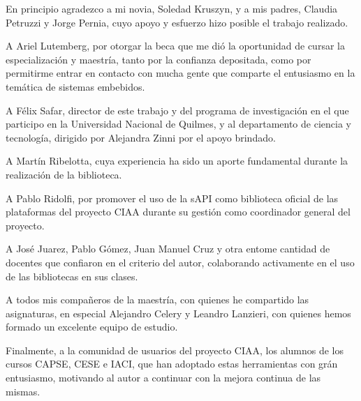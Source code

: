 En principio agradezco a mi novia, Soledad Kruszyn, y a mis padres, Claudia Petruzzi y Jorge Pernia, cuyo apoyo y esfuerzo hizo posible el trabajo realizado.

A Ariel Lutemberg, por otorgar la beca que me dió la oportunidad de cursar la especialización y maestría, tanto por la confianza depositada, como por permitirme entrar en contacto con mucha gente que comparte el entusiasmo en la temática de sistemas embebidos.

A Félix Safar, director de este trabajo y del programa de investigación en el que participo en la Universidad Nacional de Quilmes, y al departamento de ciencia y tecnología, dirigido por Alejandra Zinni por el apoyo brindado.

A Martín Ribelotta, cuya experiencia ha sido un aporte fundamental durante la realización de la biblioteca.

A Pablo Ridolfi, por promover el uso de la sAPI como biblioteca oficial de las plataformas del proyecto CIAA durante su gestión como coordinador general del proyecto.

A José Juarez, Pablo Gómez, Juan Manuel Cruz y otra entome cantidad de docentes que confiaron en el criterio del autor, colaborando activamente en el uso de las bibliotecas en sus clases.

A todos mis compañeros de la maestría, con quienes he compartido las asignaturas, en especial Alejandro Celery y Leandro Lanzieri, con quienes hemos formado un excelente equipo de estudio.

Finalmente, a la comunidad de usuarios del proyecto CIAA, los alumnos de los cursos CAPSE, CESE e IACI, que han adoptado estas herramientas con grán entusiasmo, motivando al autor a continuar con la mejora continua de las mismas.
